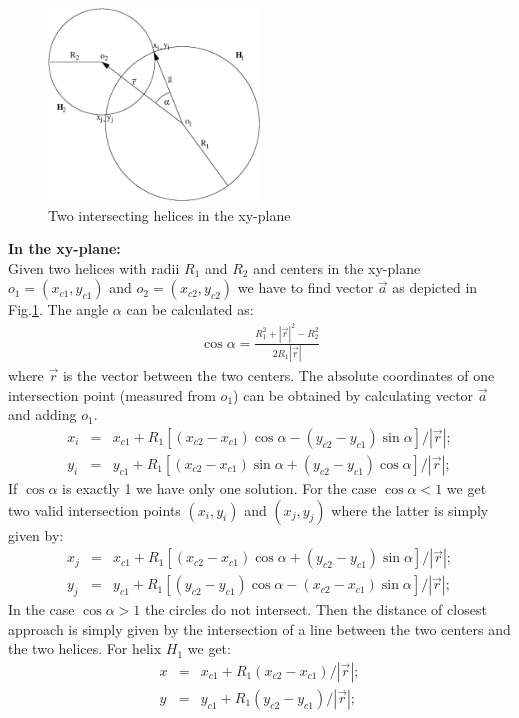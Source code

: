 \documentclass[twoside]{article}
\begin{document}
\begin{description}
\begin{figure}[hbt]  
    \begin{center}
        \includegraphics[width=0.5\textwidth]{twoHelices.eps}
        \caption{Two intersecting helices in the xy-plane}
    \end{center}
    \label{fig:dcahelices}
\end{figure}
{\bf In the xy-plane:}\\
Given two helices with radii $R_1$ and $R_2$ and centers in the
xy-plane $o_1 = (x_{c1}, y_{c1})$ and $o_2 = (x_{c2}, y_{c2})$ we have
to find vector $\vec{a}$ as depicted in Fig.\ref{fig:dcahelices}.  The
angle $\alpha$ can be calculated as:
\begin{eqnarray}
    \cos \alpha = \frac{R^2_1 + |\vec{r}|^2 - R^2_2}{2 R_1 |\vec{r}|}
\end{eqnarray}
where $\vec{r}$ is the vector between the two centers. The absolute
coordinates of one intersection point (measured from $o_1$) can be
obtained by calculating vector $\vec{a}$ and adding $o_1$.
\begin{eqnarray}
    x_i &=& x_{c1} + R_1 [ (x_{c2}-x_{c1}) \cos \alpha -  (y_{c2}-y_{c1}) \sin \alpha]/|\vec{r}|;\\
    y_i &=& y_{c1} + R_1 [ (x_{c2}-x_{c1}) \sin \alpha +  (y_{c2}-y_{c1}) \cos \alpha]/|\vec{r}|;
\end{eqnarray}
If $\cos \alpha$ is exactly 1 we have only one solution. For the case
$\cos \alpha < 1$ we get two valid intersection points $(x_i, y_i)$
and $(x_j, y_j)$ where the latter is simply given by:
\begin{eqnarray}
    x_j &=& x_{c1} + R_1 [ (x_{c2}-x_{c1}) \cos \alpha +  (y_{c2}-y_{c1}) \sin \alpha]/|\vec{r}|;\\
    y_j &=& y_{c1} + R_1 [ (y_{c2}-y_{c1}) \cos \alpha -  (x_{c2}-x_{c1}) \sin \alpha]/|\vec{r}|;
\end{eqnarray}
In the case $\cos \alpha > 1$ the circles do not intersect. Then the
distance of closest approach is simply given by the intersection of a
line between the two centers and the two helices. For helix $H_1$ we
get:
\begin{eqnarray}
    x &=& x_{c1} + R_1 (x_{c2}-x_{c1})/|\vec{r}|;\\
    y &=& y_{c1} + R_1 (y_{c2}-y_{c1})/|\vec{r}|;
\end{eqnarray}



\end{description}
\end{document}
